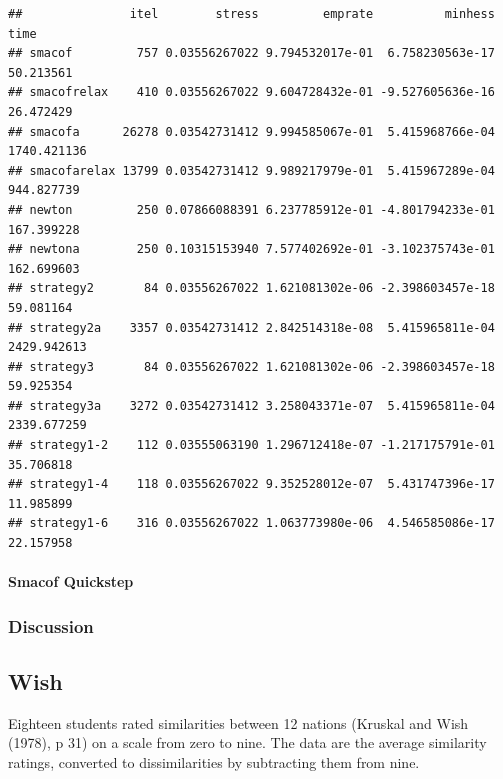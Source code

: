 \documentclass[
  12pt,
]{article}
\newenvironment{Shaded}{\begin{snugshade}}{\end{snugshade}}
\newcommand{\AttributeTok}[1]{\textcolor[rgb]{0.13,0.29,0.53}{#1}}
\newcommand{\DecValTok}[1]{\textcolor[rgb]{0.00,0.00,0.81}{#1}}
\newcommand{\FunctionTok}[1]{\textcolor[rgb]{0.13,0.29,0.53}{\textbf{#1}}}
\newcommand{\NormalTok}[1]{#1}
\newcommand{\OtherTok}[1]{\textcolor[rgb]{0.56,0.35,0.01}{#1}}
\newcommand{\SpecialCharTok}[1]{\textcolor[rgb]{0.81,0.36,0.00}{\textbf{#1}}}
\begin{document}
\begin{verbatim}
##               itel        stress         emprate          minhess        time
## smacof         757 0.03556267022 9.794532017e-01  6.758230563e-17   50.213561
## smacofrelax    410 0.03556267022 9.604728432e-01 -9.527605636e-16   26.472429
## smacofa      26278 0.03542731412 9.994585067e-01  5.415968766e-04 1740.421136
## smacofarelax 13799 0.03542731412 9.989217979e-01  5.415967289e-04  944.827739
## newton         250 0.07866088391 6.237785912e-01 -4.801794233e-01  167.399228
## newtona        250 0.10315153940 7.577402692e-01 -3.102375743e-01  162.699603
## strategy2       84 0.03556267022 1.621081302e-06 -2.398603457e-18   59.081164
## strategy2a    3357 0.03542731412 2.842514318e-08  5.415965811e-04 2429.942613
## strategy3       84 0.03556267022 1.621081302e-06 -2.398603457e-18   59.925354
## strategy3a    3272 0.03542731412 3.258043371e-07  5.415965811e-04 2339.677259
## strategy1-2    112 0.03555063190 1.296712418e-07 -1.217175791e-01   35.706818
## strategy1-4    118 0.03556267022 9.352528012e-07  5.431747396e-17   11.985899
## strategy1-6    316 0.03556267022 1.063773980e-06  4.546585086e-17   22.157958
\end{verbatim}

\paragraph{Smacof Quickstep}\label{smacof-quickstep-5}

\begin{Shaded}
\end{Shaded}

\subsubsection{Discussion}\label{discussion-4}

\subsection{Wish}\label{wish}

Eighteen students rated similarities between
12 nations (Kruskal and Wish (1978), p 31) on a scale from zero to nine. The data are the average similarity ratings, converted to dissimilarities by subtracting them from nine.
\end{document}
